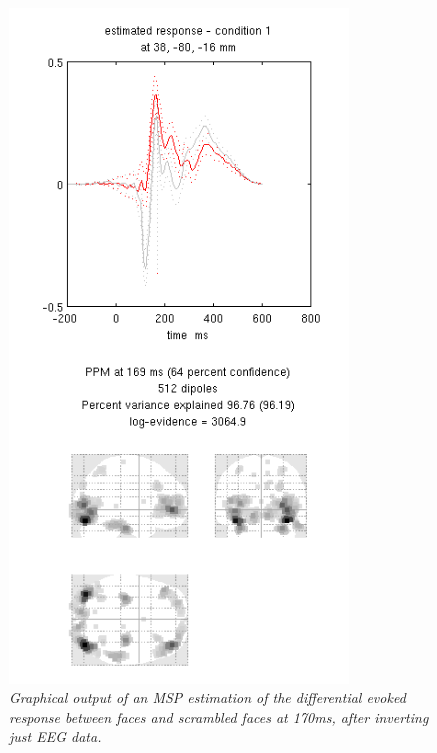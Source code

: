 \begin{figure}
\begin{center}
\includegraphics[width=90mm]{multimodal/figures/fused_eeg_msp.png}
\caption{\em Graphical output of an MSP estimation of the differential evoked response between faces and scrambled faces at 170ms, after inverting just EEG data. \label{multimodal:fusion:fig:2}}
\end{center}
\end{figure}

